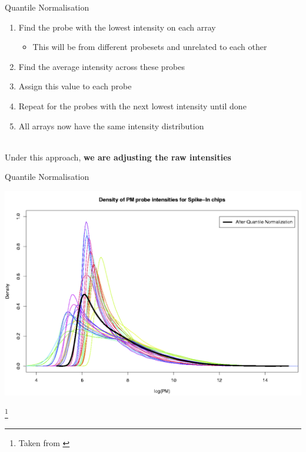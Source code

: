 \documentclass[aspectratio=169,11pt]{beamer}
\newcommand\blfootnote[1]{%
  \begingroup
  \renewcommand\thefootnote{}\footnote{#1}%
  \addtocounter{footnote}{-1}%
  \endgroup
}
\begin{document}
\begin{frame}{Quantile Normalisation}

	\begin{enumerate}
		\item Find the probe with the lowest intensity on each array
		\begin{itemize}
			\item This will be from different probesets and unrelated to each other
		\end{itemize}
		\item Find the average intensity across	these probes
		\item Assign this value to each probe
		\item Repeat for the probes with the next lowest intensity until done
		\item All arrays now have the same intensity distribution
	\end{enumerate}
	
	~\\[2mm]	
	Under this approach, \textbf{we are adjusting the raw intensities}

\end{frame}

\begin{frame}{Quantile Normalisation}

	\begin{center}
		\includegraphics[scale=0.12]{figures/quantileNorm.png} 
	\end{center}

\blfootnote{Taken from \cite{pmid12538238}}	

\end{frame}
\end{document}
